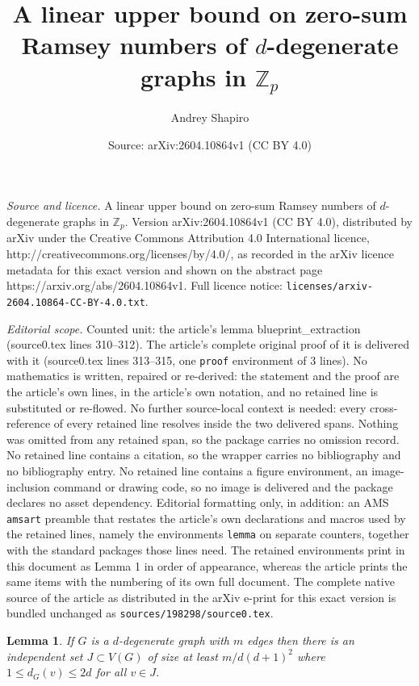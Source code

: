 \documentclass[10pt,a4paper]{amsart}
\title{A linear upper bound on zero-sum Ramsey numbers of $d$-degenerate graphs in $\mathbb{Z}_p$}
\author{Andrey Shapiro}
\date{Source: arXiv:2604.10864v1 (CC BY 4.0)}
\newtheorem{lemma}{Lemma}
\begin{document}
\maketitle

\noindent\emph{Source and licence.} A linear upper bound on zero-sum Ramsey numbers of $d$-degenerate graphs in $\mathbb{Z}_p$. Version arXiv:2604.10864v1 (CC BY 4.0), distributed by arXiv under the Creative Commons Attribution 4.0 International licence, http://creativecommons.org/licenses/by/4.0/, as recorded in the arXiv licence metadata for this exact version and shown on the abstract page https://arxiv.org/abs/2604.10864v1. Full licence notice: \texttt{licenses/arxiv-2604.10864-CC-BY-4.0.txt}.\par\smallskip

\noindent\textit{Editorial scope.} Counted unit: the article's lemma blueprint\_extraction (source0.tex lines 310--312). The article's complete original proof of it is delivered with it (source0.tex lines 313--315, one \texttt{proof} environment of 3 lines). No mathematics is written, repaired or re-derived: the statement and the proof are the article's own lines, in the article's own notation, and no retained line is substituted or re-flowed.  No further source-local context is needed: every cross-reference of every retained line resolves inside the two delivered spans.  Nothing was omitted from any retained span, so the package carries no omission record.  No retained line contains a citation, so the wrapper carries no bibliography and no bibliography entry.  No retained line contains a figure environment, an image-inclusion command or drawing code, so no image is delivered and the package declares no asset dependency.  Editorial formatting only, in addition: an AMS \texttt{amsart} preamble that restates the article's own declarations and macros used by the retained lines, namely the environments \texttt{lemma} on separate counters, together with the standard packages those lines need.  The retained environments print in this document as Lemma 1 in order of appearance, whereas the article prints the same items with the numbering of its own full document.  The complete native source of the article as distributed in the arXiv e-print for this exact version is bundled unchanged as \texttt{sources/198298/source0.tex}.
\begin{lemma}\label{blueprint_extraction}
If $G$ is a $d$-degenerate graph with $m$ edges then there is an independent set $J\subset V(G)$ of size at least $m/d(d+1)^2$ where $1\leq d_G(v)\leq 2d$ for all $v\in J$.
\end{lemma}
\end{document}
